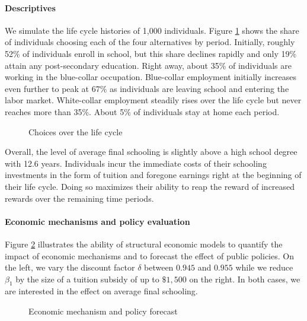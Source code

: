 \paragraph{Descriptives} We simulate the life cycle histories of 1,000 individuals. Figure \ref{Choices over the life cycle} shows the share of individuals choosing each of the four alternatives by period. Initially, roughly 52\% of individuals enroll in school, but this share declines rapidly and only 19\% attain any post-secondary education. Right away, about 35\% of individuals are working in the blue-collar occupation.  Blue-collar employment initially increases even further to peak at 67\% as individuals are leaving school and entering the labor market. White-collar employment steadily rises over the life cycle but never reaches more than 35\%. About 5\% of individuals stay at home each period.

\begin{figure}[ht!]\centering
\caption{Choices over the life cycle}\label{Choices over the life cycle}
\end{figure}\FloatBarrier

\noindent Overall, the level of average final schooling is slightly above a high school degree with 12.6 years. Individuals incur the immediate costs of their schooling investments in the form of tuition and foregone earnings right at the beginning of their life cycle. Doing so maximizes their ability to reap the reward of increased rewards over the remaining time periods.

\paragraph{Economic mechanisms and policy evaluation} Figure \ref{Economic mechanism and policy forecast} illustrates the ability of structural economic models to quantify the impact of economic mechanisms and to forecast the effect of public policies. On the left, we vary the discount factor $\delta$ between $0.945$ and $0.955$ while we reduce $\beta_1$ by the size of a tuition subsidy of up to $\$1,500$ on the right. In both cases, we are interested in the effect on average final schooling.

\begin{figure}[h!]\centering
\caption{Economic mechanism and policy forecast}\label{Economic mechanism and policy forecast}
\hspace{0.3cm}
\end{figure}\FloatBarrier

